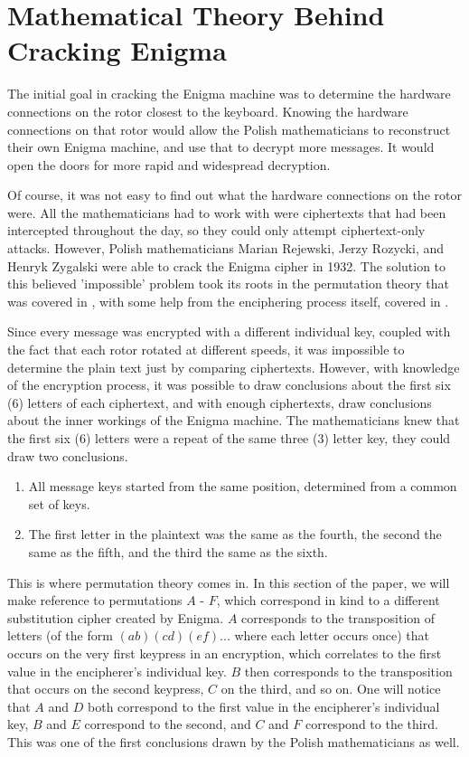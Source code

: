 \section{Mathematical Theory Behind Cracking Enigma}\label{sec:maththeory}

The initial goal in cracking the Enigma machine was to determine the hardware connections on the rotor closest to the keyboard. Knowing the hardware connections on that rotor would allow the Polish mathematicians to reconstruct their own Enigma machine, and use that to decrypt more messages. It would open the doors for more rapid and widespread decryption.

Of course, it was not easy to find out what the hardware connections on the rotor were. All the mathematicians had to work with were ciphertexts that had been intercepted throughout the day, so they could only attempt ciphertext-only attacks. However, Polish mathematicians Marian Rejewski, Jerzy Rozycki, and Henryk Zygalski were able to crack the Enigma cipher in 1932. The solution to this believed 'impossible' problem took its roots in the permutation theory that was covered in , with some help from the enciphering process itself, covered in .

Since every message was encrypted with a different individual key, coupled with the fact that each rotor rotated at different speeds, it was impossible to determine the plain text just by comparing ciphertexts. However, with knowledge of the encryption process, it was possible to draw conclusions about the first six (6) letters of each ciphertext, and with enough ciphertexts, draw conclusions about the inner workings of the Enigma machine. The mathematicians knew that the first six (6) letters were a repeat of the same three (3) letter key, they could draw two conclusions.

\begin{enumerate}
\item All message keys started from the same position, determined from a common set of keys.
\item The first letter in the plaintext was the same as the fourth, the second the same as the fifth, and the third the same as the sixth.
\end{enumerate}

This is where permutation theory comes in. In this section of the paper, we will make reference to permutations $A$ - $F$, which correspond in kind to a different substitution cipher created by Enigma. $A$ corresponds to the transposition of letters (of the form $(ab)(cd)(ef)...$ where each letter occurs once) that occurs on the very first keypress in an encryption, which correlates to the first value in the encipherer's individual key. $B$ then corresponds to the transposition that occurs on the second keypress, $C$ on the third, and so on. One will notice that $A$ and $D$ both correspond to the first value in the encipherer's individual key, $B$ and $E$ correspond to the second, and $C$ and $F$ correspond to the third. This was one of the first conclusions drawn by the Polish mathematicians as well.

